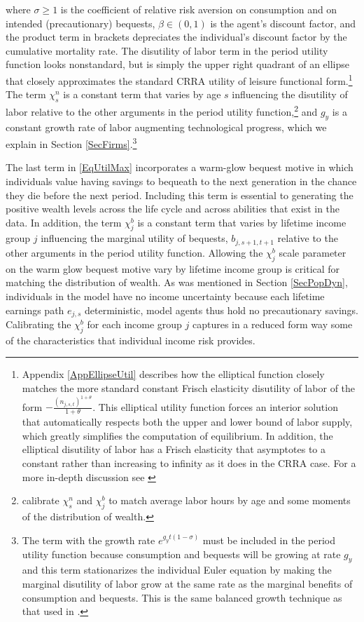 \documentclass[letterpaper,12pt]{article}
\theoremstyle{definition}
\begin{document}
\begin{spacing}{1.5}
    where $\sigma\geq 1$ is the coefficient of relative risk aversion on consumption and on intended (precautionary) bequests, $\beta\in(0,1)$ is the agent's discount factor, and the product term in brackets depreciates the individual's discount factor by the cumulative mortality rate. The disutility of labor term in the period utility function looks nonstandard, but is simply the upper right quadrant of an ellipse that closely approximates the standard CRRA utility of leisure functional form.\footnote{Appendix \ref{AppEllipseUtil} describes how the elliptical function closely matches the more standard constant Frisch elasticity disutility of labor of the form $-\frac{(n_{j,s,t})^{1+\theta}}{1+\theta}$. This elliptical utility function forces an interior solution that automatically respects both the upper and lower bound of labor supply, which greatly simplifies the computation of equilibrium. In addition, the elliptical disutility of labor has a Frisch elasticity that asymptotes to a constant rather than increasing to infinity as it does in the CRRA case. For a more in-depth discussion see \citet{EvansPhillips:2015}} The term $\chi^n_s$ is a constant term that varies by age $s$ influencing the disutility of labor relative to the other arguments in the period utility function,\footnote{\citet{DEMPRW2015} calibrate $\chi^n_s$ and $\chi^b_j$ to match average labor hours by age and some moments of the distribution of wealth.} and $g_y$ is a constant growth rate of labor augmenting technological progress, which we explain in Section \ref{SecFirms}.\footnote{The term with the growth rate $e^{g_y t(1-\sigma)}$ must be included in the period utility function because consumption and bequests will be growing at rate $g_y$ and this term stationarizes the individual Euler equation by making the marginal disutility of labor grow at the same rate as the marginal benefits of consumption and bequests.  This is the same balanced growth technique as that used in \citet{MertensRavn:2011}.}

    The last term in \eqref{EqUtilMax} incorporates a warm-glow bequest motive in which individuals value having savings to bequeath to the next generation in the chance they die before the next period. Including this term is essential to generating the positive wealth levels across the life cycle and across abilities that exist in the data. In addition, the term $\chi^b_j$ is a constant term that varies by lifetime income group $j$ influencing the marginal utility of bequests, $b_{j,s+1,t+1}$ relative to the other arguments in the period utility function. Allowing the $\chi^b_j$ scale parameter on the warm glow bequest motive vary by lifetime income group is critical for matching the distribution of wealth. As was mentioned in Section \ref{SecPopDyn}, individuals in the model have no income uncertainty because each lifetime earnings path $e_{j,s}$ deterministic, model agents thus hold no precautionary savings. Calibrating the $\chi^b_j$ for each income group $j$ captures in a reduced form way some of the characteristics that individual income risk provides.


\end{spacing}
\end{document}
